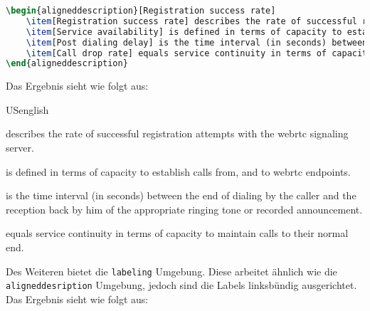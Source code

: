 \begin{lstlisting}[language=latex,breaklines]
\begin{aligneddescription}[Registration success rate]
	\item[Registration success rate] describes the rate of successful registration attempts with the \ac{webrtc} signaling server.
	\item[Service availability] is defined in terms of capacity to establish calls from, and to \ac{webrtc} endpoints. 
	\item[Post dialing delay] is the time interval (in seconds) between the end of dialing by the caller and the reception back by him of the appropriate ringing tone or recorded announcement.
	\item[Call drop rate] equals service continuity in terms of capacity to maintain calls to their normal end.
\end{aligneddescription}
\end{lstlisting}
Das Ergebnis sieht wie folgt aus:
\begin{otherlanguage*}{USenglish} %
\begin{aligneddescription}
	\item[Registration success rate] describes the rate of successful registration attempts with the \ac{webrtc} signaling server.
	\item[Service availability] is defined in terms of capacity to establish calls from, and to \ac{webrtc} endpoints. 
	\item[Post dialing delay] is the time interval (in seconds) between the end of dialing by the caller and the reception back by him of the appropriate ringing tone or recorded announcement.
	\item[Call drop rate] equals service continuity in terms of capacity to maintain calls to their normal end.
\end{aligneddescription}
\end{otherlanguage*}

Des Weiteren bietet \KOMAScript{} die \texttt{labeling} Umgebung. Diese arbeitet ähnlich wie die \texttt{aligneddesription} Umgebung, jedoch sind die Labels linksbündig ausgerichtet. Das Ergebnis sieht wie folgt aus:

